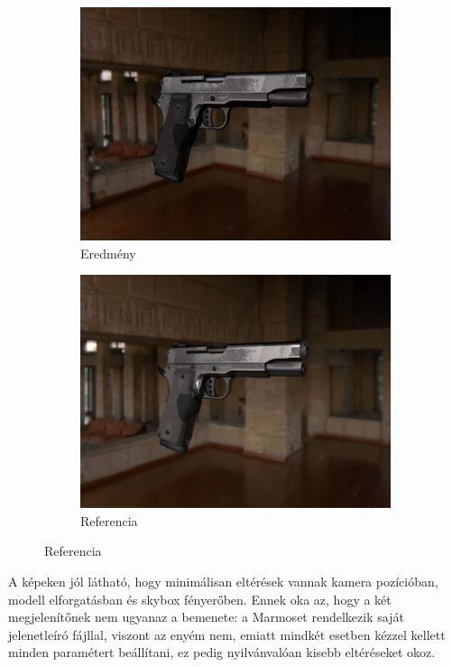 \begin{figure}[!ht]
    \centering
    \begin{subfigure}[b]{0.45\textwidth}
        \centering
        \includegraphics[width=\textwidth]{images/scr_ennis.png}
        \caption{Eredmény}
    \end{subfigure}
    \hfill
    \begin{subfigure}[b]{0.45\textwidth}
        \centering
        \includegraphics[width=\textwidth]{images/marmoset_ennis.png}
        \caption{Referencia}
    \end{subfigure}
\end{figure}

A képeken jól látható, hogy minimálisan eltérések vannak kamera pozícióban, modell elforgatásban és skybox fényerőben. Ennek oka az, hogy a két megjelenítőnek nem ugyanaz a bemenete: a Marmoset rendelkezik saját jelenetleíró fájllal, viszont az enyém nem, emiatt mindkét esetben kézzel kellett minden paramétert beállítani, ez pedig nyilvánvalóan kisebb eltéréseket okoz.

